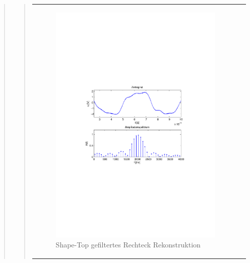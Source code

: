 \begin{quote}
\begin{quote}
\begin{center}
\begin{tabular}{ll}
            \hspace{-5cm}
                \begin{minipage}{0.6\textwidth}
                    \begin{figure}[H]
                        \includegraphics[scale=0.7, trim = 35mm 100mm 35mm 95mm, clip]{Bilder/flatrecFil20_05}
                          \caption{Shape-Top gefiltertes Rechteck Rekonstruktion}
		                  \label{fig:flatrecFil20_05}
                    \end{figure}
                \end{minipage}
                

\end{tabular}
\end{center}
\end{quote}
\end{quote}
